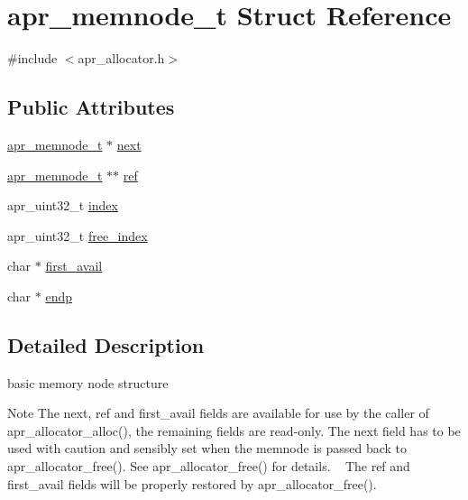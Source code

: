 \hypertarget{structapr__memnode__t}{}\section{apr\+\_\+memnode\+\_\+t Struct Reference}
\label{structapr__memnode__t}


{\ttfamily \#include $<$apr\+\_\+allocator.\+h$>$}

\subsection*{Public Attributes}
\begin{DoxyCompactItemize}
\item 
\mbox{\hyperlink{structapr__memnode__t}{apr\+\_\+memnode\+\_\+t}} $\ast$ \mbox{\hyperlink{structapr__memnode__t_a07dd84ca152164d6bc283dbce99f8f78}{next}}
\item 
\mbox{\hyperlink{structapr__memnode__t}{apr\+\_\+memnode\+\_\+t}} $\ast$$\ast$ \mbox{\hyperlink{structapr__memnode__t_ac68a939c0c3d48498ec0c0fde409c502}{ref}}
\item 
apr\+\_\+uint32\+\_\+t \mbox{\hyperlink{structapr__memnode__t_a6188325f9e1cbcafcb0a65b7e41881a1}{index}}
\item 
apr\+\_\+uint32\+\_\+t \mbox{\hyperlink{structapr__memnode__t_af63769f30f6eb9d72e4b24050bd7a9d9}{free\+\_\+index}}
\item 
char $\ast$ \mbox{\hyperlink{structapr__memnode__t_a863e7980225e46678881271c4c803e4c}{first\+\_\+avail}}
\item 
char $\ast$ \mbox{\hyperlink{structapr__memnode__t_a35c9bf71f1cc680929f857176b547a05}{endp}}
\end{DoxyCompactItemize}


\subsection{Detailed Description}
basic memory node structure \begin{DoxyNote}{Note}
The next, ref and first\+\_\+avail fields are available for use by the caller of apr\+\_\+allocator\+\_\+alloc(), the remaining fields are read-\/only. The next field has to be used with caution and sensibly set when the memnode is passed back to apr\+\_\+allocator\+\_\+free(). See apr\+\_\+allocator\+\_\+free() for details. ~\newline
 The ref and first\+\_\+avail fields will be properly restored by apr\+\_\+allocator\+\_\+free(). 
\end{DoxyNote}


